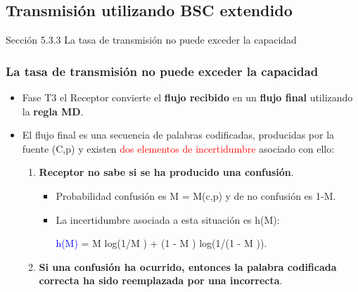 \documentclass{beamer}
\theoremstyle{plain}
\theoremstyle{example}
\theoremstyle{example}
\begin{document}
\subsection{Transmisión utilizando BSC extendido}
\begin{frame}   \footnotesize
{
\begin{block}{Sección 5.3.3}
La tasa de transmisión no puede exceder la capacidad
\end{block}
}
\end{frame}
\begin{frame}  \frametitle{La tasa de transmisión no puede exceder la capacidad}\footnotesize  

\begin{itemize} 


\item Fase T3 el  Receptor convierte el \textbf{flujo recibido} en un \textbf{flujo final} utilizando la \textbf{regla MD}. 

\item  El flujo final es una secuencia de palabras codificadas,  producidas por la fuente (C,p) y existen \textcolor{red}{dos elementos de incertidumbre} asociado con ello:

\begin{enumerate}\footnotesize  
\item  \textbf{Receptor no sabe si se ha producido una confusión}.  

\begin{itemize}\footnotesize  

\item Probabilidad  confusión es M = M(c,p) y de no confusión es 1-M. 

\item La incertidumbre asociada a esta situación es h(M):

\begin{center}
\textcolor{blue}{h(M)} = M log(1/M ) + (1 - M ) log(1/(1 - M )).
\end{center}
\end{itemize}

\item \textbf{Si una confusión ha ocurrido, entonces la palabra codificada correcta ha sido reemplazada por una incorrecta}.


\end{enumerate}
\end{itemize}
\end{frame}
\end{document}
